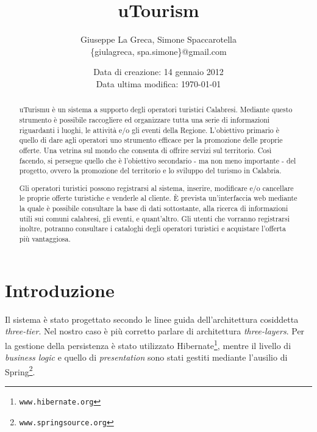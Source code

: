 \documentclass[a4paper,11pt]{report}
\title{uTourism}
\author{Giuseppe La Greca, Simone Spaccarotella\\\small{\{giulagreca, spa.simone\}@gmail.com}}
\date{\small{Data di creazione: 14 gennaio 2012\\Data ultima modifica: \today}}
\begin{document}
  \maketitle
  \tableofcontents

  \begin{abstract}
    uTurismu è un sistema a supporto degli operatori turistici Calabresi. Mediante questo strumento è possibile  
    raccogliere ed organizzare tutta una serie di informazioni riguardanti i luoghi, le attività e/o gli eventi della 
    Regione. L'obiettivo primario è quello di dare agli operatori uno strumento efficace per la promozione delle proprie 
    offerte. Una vetrina sul mondo che consenta di offrire servizi sul territorio. Così facendo, si persegue quello che 
    è l'obiettivo secondario - ma non meno importante - del progetto, ovvero la promozione del territorio e lo sviluppo 
    del turismo in Calabria.

    Gli operatori turistici possono registrarsi al sistema, inserire, modificare e/o cancellare le proprie offerte 
    turistiche e venderle al cliente. È prevista un'interfaccia web mediante la quale è possibile consultare la base di 
    dati sottostante, alla ricerca di informazioni utili sui comuni calabresi, gli eventi, e quant'altro. Gli utenti che 
    vorranno registrarsi inoltre, potranno consultare i cataloghi degli operatori turistici e acquistare l'offerta più 
    vantaggiosa.
  \end{abstract}

  \chapter{Introduzione}
    Il sistema è stato progettato secondo le linee guida dell'architettura cosiddetta \textit{three-tier}. Nel nostro 
    caso è più corretto parlare di architettura \textit{three-layers}. Per la gestione della persistenza è stato 
    utilizzato Hibernate\footnote{\texttt{www.hibernate.org}}, mentre il livello di \textit{business logic} e quello di 
    \textit{presentation} sono stati gestiti mediante l'ausilio di Spring\footnote{\texttt{www.springsource.org}}.
    
\end{document}
